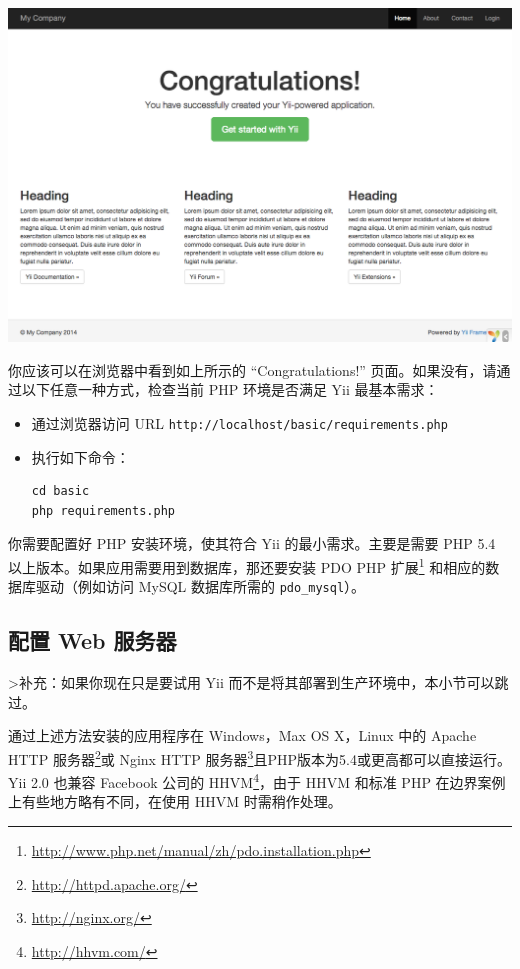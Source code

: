 \noindent\includegraphics[width=\textwidth]{images/start-app-installed.png}

你应该可以在浏览器中看到如上所示的 “Congratulations!” 页面。如果没有，请通过以下任意一种方式，检查当前 PHP 环境是否满足 Yii 最基本需求：

\begin{itemize}
\item 通过浏览器访问 URL \lstinline|http://localhost/basic/requirements.php|
\item 执行如下命令：

\begin{lstlisting}
cd basic
php requirements.php
\end{lstlisting}

\end{itemize}
你需要配置好 PHP 安装环境，使其符合 Yii 的最小需求。主要是需要 PHP 5.4 以上版本。如果应用需要用到数据库，那还要安装 PDO PHP 扩展\footnote{\url{http://www.php.net/manual/zh/pdo.installation.php}} 和相应的数据库驱动（例如访问 MySQL 数据库所需的 \lstinline|pdo_mysql|）。

\subsection{配置 Web 服务器 \label{start-installation.md::configuring-web-servers}}
>补充：如果你现在只是要试用 Yii 而不是将其部署到生产环境中，本小节可以跳过。

通过上述方法安装的应用程序在 Windows，Max OS X，Linux 中的 Apache HTTP 服务器\footnote{\url{http://httpd.apache.org/}}或 Nginx HTTP 服务器\footnote{\url{http://nginx.org/}}且PHP版本为5.4或更高都可以直接运行。Yii 2.0 也兼容 Facebook 公司的 HHVM\footnote{\url{http://hhvm.com/}}，由于 HHVM 和标准 PHP 在边界案例上有些地方略有不同，在使用 HHVM 时需稍作处理。


